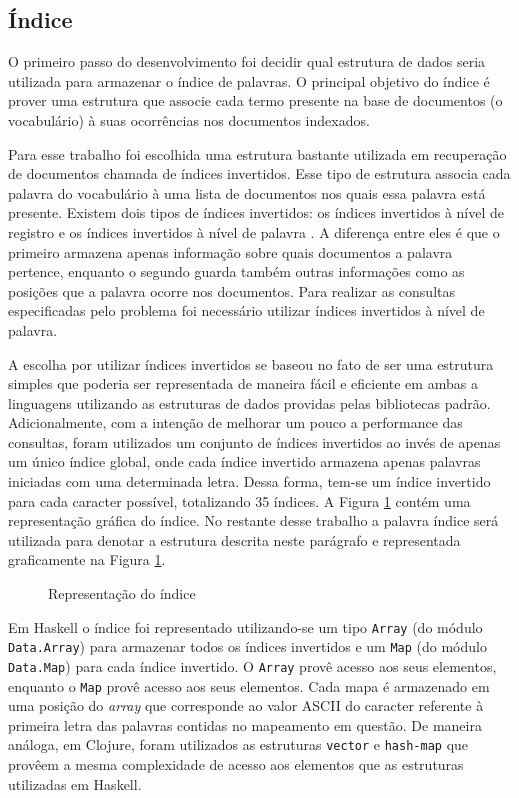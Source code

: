 \subsection{Índice}

O primeiro passo do desenvolvimento foi decidir qual estrutura de dados seria utilizada para armazenar o índice de palavras. O principal objetivo do índice é prover uma estrutura que associe cada termo presente na base de documentos (o vocabulário) à suas ocorrências nos documentos indexados.

Para esse trabalho foi escolhida uma estrutura bastante utilizada em recuperação de documentos chamada de índices invertidos. Esse tipo de estrutura associa cada palavra  do vocabulário à uma lista de documentos nos quais essa palavra está presente. Existem dois tipos de índices invertidos: os índices invertidos à nível de registro e os índices invertidos à nível de palavra \cite{baeza1999modern}. A diferença entre eles é que o primeiro armazena apenas informação sobre quais documentos a palavra pertence, enquanto o segundo guarda também outras informações como as posições que a palavra ocorre nos documentos. Para realizar as consultas especificadas pelo problema foi necessário utilizar índices invertidos à nível de palavra.

A escolha por utilizar índices invertidos se baseou no fato de ser uma estrutura simples que poderia ser representada de maneira fácil e eficiente em ambas a linguagens utilizando as estruturas de dados providas pelas bibliotecas padrão. Adicionalmente, com a intenção de melhorar um pouco a performance das consultas, foram utilizados um conjunto de índices invertidos ao invés de apenas um único índice global, onde cada índice invertido armazena apenas palavras iniciadas com uma determinada letra. Dessa forma, tem-se um índice invertido para cada caracter possível, totalizando 35 índices. A Figura \ref{fig:indice} contém uma representação gráfica do índice. No restante desse trabalho a palavra índice será utilizada para denotar a estrutura descrita neste parágrafo e representada graficamente na Figura \ref{fig:indice}.

\begin{figure}[h]
 \centering
 \def\svgwidth{0.6\columnwidth}
 
 \caption{Representação do índice}
 \label{fig:indice}
\end{figure}


Em Haskell o índice foi representado utilizando-se um tipo \verb|Array| (do módulo \verb|Data.Array|) para armazenar todos os índices invertidos e um \verb|Map| (do módulo \verb|Data.Map|) para cada índice invertido. O \verb|Array| provê acesso  aos seus elementos, enquanto o \verb|Map| provê acesso  aos seus elementos. Cada mapa é armazenado em uma posição do \emph{array} que corresponde ao valor ASCII do caracter referente à primeira letra das palavras contidas no mapeamento em questão. De maneira análoga, em Clojure, foram utilizados as estruturas \verb|vector| e \verb|hash-map| que provêem a mesma complexidade de acesso aos elementos que as estruturas utilizadas em Haskell.

